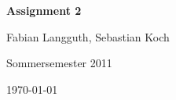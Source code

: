 



% 

\begin{center}
    \huge {\bf Assignment 2}
    
    \small Fabian Langguth, Sebastian Koch
    
    Sommersemester 2011
    
    \today
\end{center}
%



